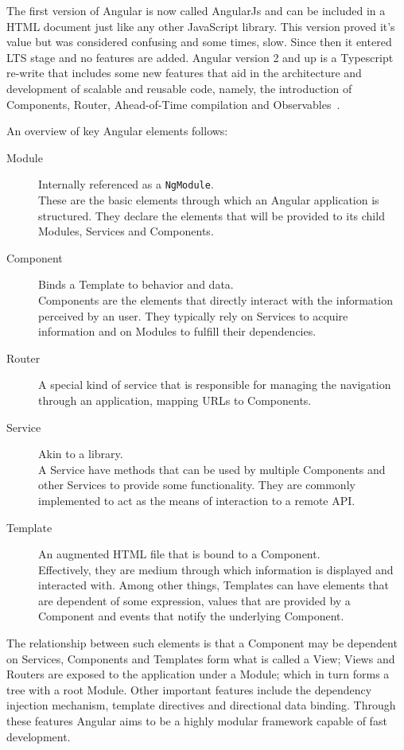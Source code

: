 The first version of Angular is now called AngularJs and can be included in a \gls{HTML} document just like any other JavaScript library. This version proved it's value but was considered confusing and some times, slow. Since then it entered \gls{LTS} stage and no features are added. Angular version 2 and up is a Typescript re-write that includes some new features that aid in the architecture and development of scalable and reusable code, namely, the introduction of Components, Router, Ahead-of-Time compilation and Observables~\cite{angular}.

An overview of key Angular elements follows:
\begin{description}
\item[Module] Internally referenced as a \texttt{NgModule}. \\
  These are the basic elements through which an Angular application is structured\cite{angularmodule}. They declare the elements that will be provided to its child Modules, Services and Components.
\item[Component] Binds a Template to behavior and data.\\ Components are the elements that directly interact with the information perceived by an user. They typically rely on Services to acquire information and on Modules to fulfill their dependencies. 
\item[Router] A special kind of service that is responsible for managing the navigation through an application, mapping \gls{URL}s to Components.
\item[Service] Akin to a library.\\ A Service have methods that can be used by multiple Components and other Services to provide some functionality. They are commonly implemented to act as the means of interaction to a remote \gls{API}.
\item[Template] An augmented \gls{HTML} file that is bound to a Component.\\
  Effectively, they are medium through which information is displayed and interacted with. Among other things, Templates can have elements that are dependent of some expression, values that are provided by a Component and events that notify the underlying Component.
\end{description}

The relationship between such elements is that a Component may be dependent on Services, Components and Templates form what is called a View; Views and Routers are exposed to the application under a Module; which in turn forms a tree with a root Module.
Other important features include the dependency injection mechanism, template directives and directional data binding. Through these features Angular aims to be a highly modular framework capable of fast development.

